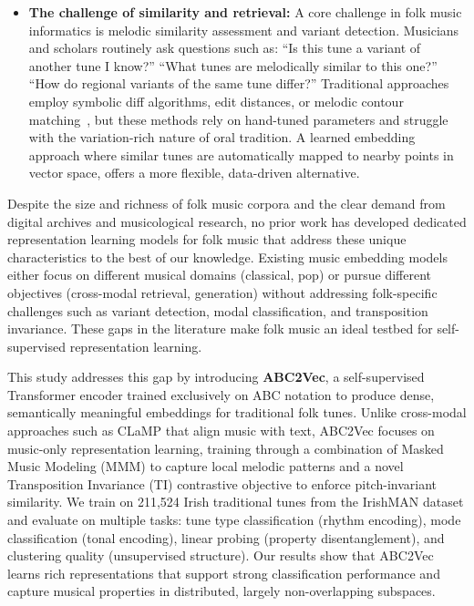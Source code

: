 \documentclass[]{interact}
\theoremstyle{plain}
\theoremstyle{definition}
\theoremstyle{remark}
\begin{document}
\begin{itemize}
\item \textbf{The challenge of similarity and retrieval:} A core challenge in folk music informatics is melodic similarity assessment and variant detection. Musicians and scholars routinely ask questions such as: ``Is this tune a variant of another tune I know?'' ``What tunes are melodically similar to this one?'' ``How do regional variants of the same tune differ?'' Traditional approaches employ symbolic diff algorithms, edit distances, or melodic contour matching~\cite{FolkMusicVariation2017,FolkMusicAnalysis2020}, but these methods rely on hand-tuned parameters and struggle with the variation-rich nature of oral tradition. A learned embedding approach where similar tunes are automatically mapped to nearby points in vector space, offers a more flexible, data-driven alternative.
\end{itemize}

Despite the size and richness of folk music corpora and the clear demand from digital archives and musicological research, no prior work has developed dedicated representation learning models for folk music that address these unique characteristics to the best of our knowledge. Existing music embedding models either focus on different musical domains (classical, pop) or pursue different objectives (cross-modal retrieval, generation) without addressing folk-specific challenges such as variant detection, modal classification, and transposition invariance. These gaps in the literature make folk music an ideal testbed for self-supervised representation learning.

This study addresses this gap by introducing \textbf{ABC2Vec}, a self-supervised Transformer encoder trained exclusively on ABC notation to produce dense, semantically meaningful embeddings for traditional folk tunes. Unlike cross-modal approaches such as CLaMP that align music with text, ABC2Vec focuses on music-only representation learning, training through a combination of Masked Music Modeling (MMM) \cite{garcia2023vampnet} to capture local melodic patterns and a novel Transposition Invariance \cite{muller2007transposition,lattner2018learning} (TI) contrastive objective to enforce pitch-invariant similarity. We train on 211,524 Irish traditional tunes from the IrishMAN dataset and evaluate on multiple tasks: tune type classification (rhythm encoding), mode classification (tonal encoding), linear probing (property disentanglement), and clustering quality (unsupervised structure). Our results show that ABC2Vec learns rich representations that support strong classification performance and capture musical properties in distributed, largely non-overlapping subspaces.
\end{document}
